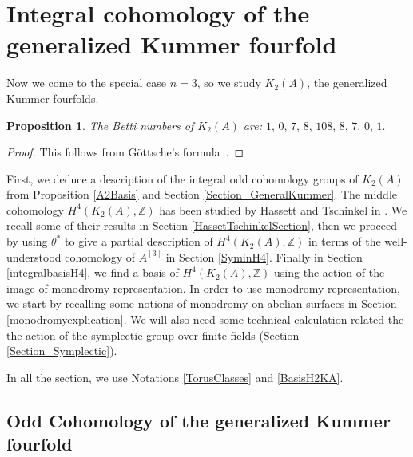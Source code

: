 \documentclass{alggeom}
\newcommand{\hilb}[1]{^{[#1]}}
\newcommand{\kum}[2]{K_{ #2 }( #1 )}
\newcommand{\X}{\kum{A}{2}}
\newcommand{\Z}{\mathbb{Z}}
\theoremstyle{plain}
\newtheorem{proposition}[theorem]{Proposition}
\theoremstyle{definition}
\theoremstyle{remark}
\begin{document}
%

\section{Integral cohomology of the generalized Kummer fourfold}
Now we come to the special case $n=3$, so we study $\kum{A}{2}$, the generalized Kummer fourfolds.
\begin{proposition}
The Betti numbers of $\kum{A}{2}$ are:
$
1,\,0,\,7,\,8,\,108,\,8,\,7,\,0,\,1.
$
\end{proposition}
\begin{proof}
This follows from G\"ottsche's formula~\cite[page 49]{Gottsche}.
\end{proof}

First, we deduce a description of the integral odd cohomology groups of $\X$ from Proposition \ref{A2Basis} and Section \ref{Section_GeneralKummer}.
The middle cohomology $H^4(\X,\Z)$ has been studied by Hassett and Tschinkel in \cite{Hassett}. We recall some of their results in Section \ref{HassetTschinkelSection},
then we proceed by using $\theta^*$ to give a partial description of $H^4(\X,\Z)$ in terms of the well-understood cohomology of $A\hilb{3}$ in Section \ref{SyminH4}. 
Finally in Section \ref{integralbasisH4}, we find a basis of $H^4(\X,\Z)$ using the action of the image of monodromy representation.
In order to use monodromy representation, we start by recalling some notions of monodromy on abelian surfaces in Section \ref{monodromyexplication}. 
We will also need some technical calculation related the the action of the symplectic group over finite fields (Section \ref{Section_Symplectic}).

In all the section, we use Notations \ref{TorusClasses} and \ref{BasisH2KA}.
\subsection{Odd Cohomology of the generalized Kummer fourfold}\label{oddcohoK2}
\end{document}
